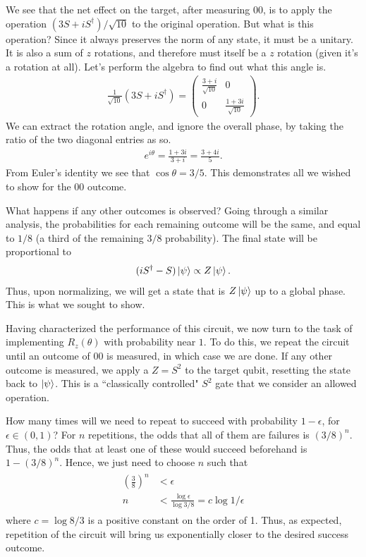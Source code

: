 \documentclass{book}
\begin{document}
    We see that the net effect on the target, after measuring $00$, is to apply the operation $(3 S + i S^\dagger)/\sqrt{10}$ to the original operation. But what is this operation? Since it always preserves the norm of any state, it must be a unitary. It is also a sum of $z$ rotations, and therefore must itself be a $z$ rotation (given it's a rotation at all). Let's perform the algebra to find out what this angle is.
    \begin{align}
        \frac{1}{\sqrt{10}}(3 S + i S^\dagger) = \begin{pmatrix}
            \frac{3 + i}{\sqrt{10}} & 0 \\
            0 & \frac{1 + 3i}{\sqrt{10}}
        \end{pmatrix}.
    \end{align}
    We can extract the rotation angle, and ignore the overall phase, by taking the ratio of the two diagonal entries as so.
    \begin{align}
        e^{i\theta} = \frac{1 + 3i}{3 + i} = \frac{3 + 4i}{5}.
    \end{align}
    From Euler's identity we see that $\cos\theta = 3/5$. This demonstrates all we wished to show for the $00$ outcome.

    What happens if any other outcomes is observed? Going through a similar analysis, the probabilities for each remaining outcome will be the same, and equal to $1/8$ (a third of the remaining $3/8$ probability). The final state will be proportional to 
    \begin{align}
        (i S^\dagger - S) \ket{\psi} \propto Z \ket{\psi}.
    \end{align}
    Thus, upon normalizing, we will get a state that is $Z \ket{\psi}$ up to a global phase. This is what we sought to show.

    Having characterized the performance of this circuit, we now turn to the task of implementing $R_{z}(\theta)$ with probability near $1$. To do this, we repeat the circuit until an outcome of $00$ is measured, in which case we are done. If any other outcome is measured, we apply a $Z = S^2$ to the target qubit, resetting the state back to $\ket{\psi}$. This is a ``classically controlled" $S^2$ gate that we consider an allowed operation.

    How many times will we need to repeat to succeed with probability $1-\epsilon$, for $\epsilon \in (0,1)$? For $n$ repetitions, the odds that all of them are failures is $(3/8)^n$. Thus, the odds that at least one of these would succeed beforehand is $1 - (3/8)^n$. Hence, we just need to choose $n$ such that
    \begin{align}
    \begin{aligned}
        \left(\frac{3}{8}\right)^n &< \epsilon \\
        n &< \frac{\log \epsilon}{\log 3/8} = c \log 1/\epsilon
    \end{aligned}
    \end{align}
    where $c = \log 8/3$ is a positive constant on the order of 1. Thus, as expected, repetition of the circuit will bring us exponentially closer to the desired success outcome.
\end{document}
